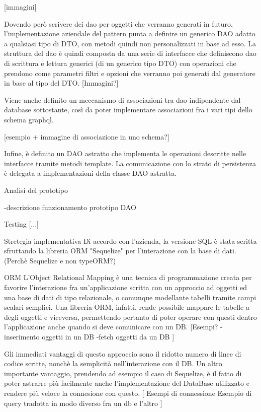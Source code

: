         [immagini]

        Dovendo però scrivere dei dao per oggetti che verranno generati in futuro, l'implementazione aziendale del pattern punta a definire un generico DAO adatto a qualsiasi tipo di DTO, con metodi quindi non personalizzati in base ad esso.
        La struttura del dao è quindi composta da una serie di interfacce che definiscono dao di scrittura e lettura generici (di un generico tipo DTO) con operazioni che prendono come parametri filtri e opzioni che verranno poi generati dal generatore in base al tipo del DTO.
        [Immagini?]
        
        Viene anche definito un meccanismo di associazioni tra dao indipendente dal database sottostante, così da poter implementare associazioni fra i vari tipi dello schema graphql.

        [esempio + immagine di associazione in uno schema?]

        Infine, è definito un DAO astratto che implementa le operazioni descritte nelle interfacce tramite metodi template.
        La comunicazione con lo strato di persistenza è delegata a implementazioni della classe DAO astratta.
        
Analisi del prototipo
        
    -descrizione funzionamento prototipo DAO

Testing
    [...]
        
Stretegia implementativa
    Di accordo con l'azienda, la versione SQL è stata scritta sfruttando la libreria ORM "Sequelize" per l'interazione con la base di dati. (Perchè Sequelize e non typeORM?)
        
    ORM
        L'Object Relational Mapping è una tecnica di programmazione creata per favorire l'interazione fra un'applicazione scritta con un approccio ad oggetti ed una base di dati di tipo relazionale, o comunque modellante tabelli tramite campi scalari semplici.
        Una libreria ORM, infatti, rende possibile mappare le tabelle a degli oggetti e viceversa, permettendo pertanto di poter operare con questi dentro l'applicazione anche quando si deve comunicare con un DB.
        [Esempi?
            -inserimento oggetti in un DB
            -fetch oggetti da un DB
        ]

        Gli immediati vantaggi di questo approccio sono il ridotto numero di linee di codice scritte, nonchè la semplicità nell'interazione con il DB.
        Un altro importante vantaggio, prendendo ad esempio il caso di Sequelize, è il fatto di poter astrarre più facilmente anche l'implementazione del DataBase utilizzato e rendere più veloce la connesione con questo.
        [
            Esempi di connessione
            Esempio di query tradotta in modo diverso fra un db e l'altro
        ]

